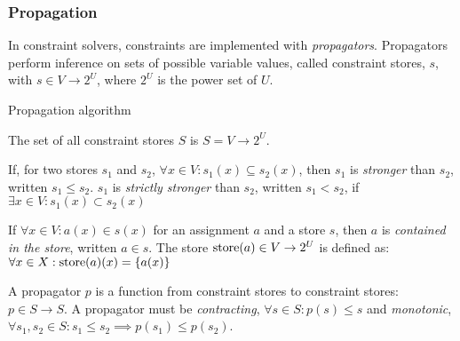 \subsubsection{Propagation}
In constraint solvers, constraints are implemented with \textit{propagators}.
Propagators perform inference on sets of possible variable values, called constraint stores, $s$, with $s \in V \rightarrow 2^U$, where $2^U$ is the power set of $U$.
\begin{algorithm}
    \caption{Propagation algorithm}
    \label{alg:prop}
    \begin{algorithmic}
                \EndIf
                \EndIf
            \EndWhile
        \EndFunction
    \end{algorithmic}
\end{algorithm}
The set of all constraint stores $S$ is $S = V \rightarrow 2^U$.

If, for two stores $s_1$ and $s_2$, $\forall x \in V : s_1(x) \subseteq s_2(x)$, then $s_1$ is \textit{stronger} than $s_2$, written $s_1 \leq s_2$. $s_1$ is \textit{strictly stronger} than $s_2$, written $s_1 < s_2$, if $\exists x \in V : s_1(x) \subset s_2(x)$

If $\forall x \in V : a(x) \in s(x)$ for an assignment $a$ and a store $s$, then $a$ is \textit{contained in the store}, written $a \in s$. 
The store $\operatorname{store}(a) \in V \rightarrow 2^U$ is defined as: $\forall x \in X : \operatorname{store}(a)(x) = \left\{a(x)\right\}$

A propagator $p$ is a function from constraint stores to constraint stores: $p \in S \rightarrow S$. A propagator must be \textit{contracting}, $\forall s \in S : p(s) \leq s$ and \textit{monotonic}, $\forall s_1, s_2 \in S : s_1 \leq s_2 \implies p(s_1) \leq p(s_2)$.

